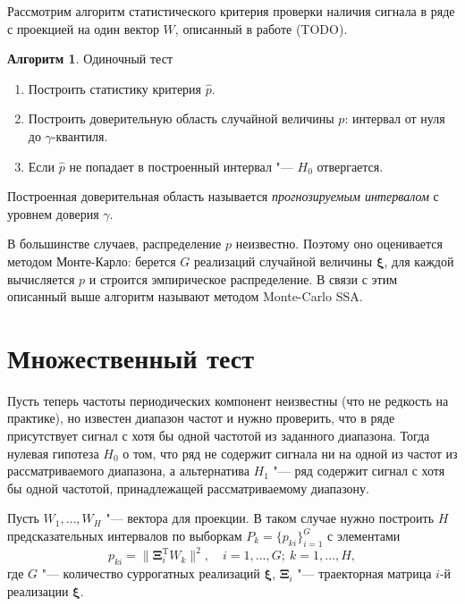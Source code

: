 \documentclass[specialist,
substylefile = spbu_report.rtx,
subf,href,colorlinks=true, 12pt]{disser}
\newcommand{\transponse}{^\mathrm{T}}
\theoremstyle{definition}
\newtheorem{algorithm}{Алгоритм}
\begin{document}
	Рассмотрим алгоритм статистического критерия проверки наличия сигнала в ряде с проекцией на один вектор $W$, описанный в работе (TODO).
	\begin{algorithm}{Одиночный тест}
		\begin{enumerate}
			\item Построить статистику критерия $\widehat p$.
			\item Построить доверительную область случайной величины $p$: интервал от нуля до $\gamma$-квантиля.
			\item Если $\widehat p$	не попадает в построенный интервал "--- $H_0$ отвергается. 
		\end{enumerate}
	\end{algorithm}
	Построенная доверительная область называется \textit{прогнозируемым интервалом} с уровнем доверия $\gamma$.
	
	В большинстве случаев, распределение $p$ неизвестно. Поэтому оно оценивается методом Монте-Карло: берется $G$ реализаций случайной величины $\boldsymbol\xi$, для каждой вычисляется $p$ и строится эмпирическое распределение. В связи с этим описанный выше алгоритм называют методом Monte-Carlo SSA. 
	\section{Множественный тест}
	Пусть теперь частоты периодических компонент неизвестны (что не редкость на практике), но известен диапазон частот и нужно проверить, что в ряде присутствует сигнал с хотя бы одной частотой из заданного диапазона. Тогда нулевая гипотеза $H_0$ о том, что ряд не содержит сигнала ни на одной из частот из рассматриваемого диапазона, а альтернатива $H_1$ "--- ряд содержит сигнал с хотя бы одной частотой, принадлежащей рассматриваемому диапазону.
	
	Пусть $W_1,\ldots,W_H$ "--- вектора для проекции. В таком случае нужно построить $H$ предсказательных интервалов по выборкам $P_k=\{p_{ki}\}_{i=1}^G$ с элементами
	\begin{equation}
		p_{ki}=\|\mathbf{\Xi}_i\transponse W_k\|^2,\quad i=1,\ldots,G;\ k=1,\ldots,H,
	\end{equation}
	где $G$ "--- количество суррогатных реализаций $\boldsymbol{\xi}$, $\mathbf{\Xi}_i$ "--- траекторная матрица $i$-й реализации $\boldsymbol{\xi}$. 
	
\end{document}
